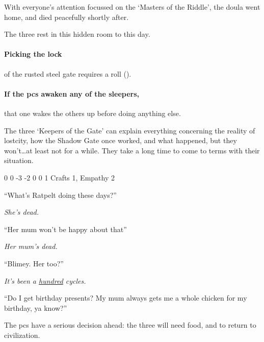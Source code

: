 \begin{multicols}{2}
\begin{exampletext}
  With everyone's attention focussed on the `Masters of the Riddle', the \gls{doula} went home, and died peacefully shortly after.

  The three rest in this hidden room to this day.
\end{exampletext}

\paragraph{Picking the lock}
of the rusted steel gate requires a  roll (\tn[16]).

\paragraph{If the \glspl{pc} awaken any of the sleepers,}
that one wakes the others up before doing anything else.

The three `Keepers of the Gate' can explain everything concerning the reality of \gls{lostcity}, how the Shadow Gate once worked, and what happened, but they won't\ldots at least not for a while.
They take a long time to come to terms with their situation.

\setcounter{Intelligence}{-2}
{0}%
{0}%
{{-3}%
{-2}%
{0}}%
{0}%
{1}%
{Crafts 1, Empathy 2}%
{\Dagger}%
{}

\begin{speechtext}
  ``What's Ratpelt doing these days?''

  \textit{\raggedleft{} She's dead.}

  ``Her mum won't be happy about that''

  \textit{\raggedleft{} Her mum's dead.}

  ``Blimey. Her too?''

  \textit{\raggedleft{} It's been a \underline{hundred} \glspl{cycle}.}

  ``Do I get birthday presents?
  My mum always gets me a whole chicken for my birthday, ya know?''
\end{speechtext}

The \glspl{pc} have a serious decision ahead: the three will need food, and to return to civilization.



\end{multicols}
